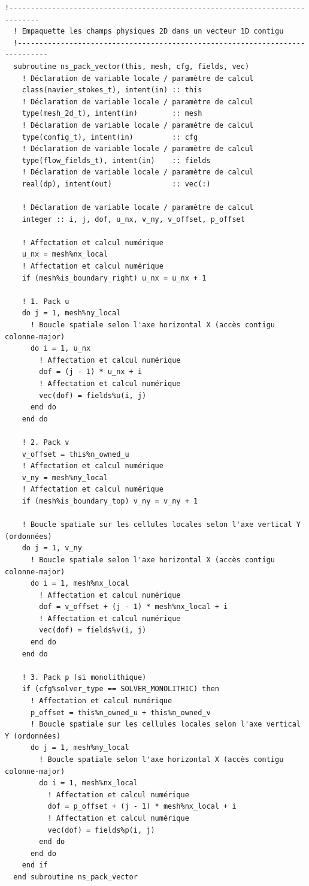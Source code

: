 \documentclass[10pt,a4paper,oneside]{book}
\begin{document}
\begin{lstlisting}[language={[95]Fortran}]
  !-----------------------------------------------------------------------------
  ! Empaquette les champs physiques 2D dans un vecteur 1D contigu
  !-----------------------------------------------------------------------------
  subroutine ns_pack_vector(this, mesh, cfg, fields, vec)
    ! Déclaration de variable locale / paramètre de calcul
    class(navier_stokes_t), intent(in) :: this
    ! Déclaration de variable locale / paramètre de calcul
    type(mesh_2d_t), intent(in)        :: mesh
    ! Déclaration de variable locale / paramètre de calcul
    type(config_t), intent(in)         :: cfg
    ! Déclaration de variable locale / paramètre de calcul
    type(flow_fields_t), intent(in)    :: fields
    ! Déclaration de variable locale / paramètre de calcul
    real(dp), intent(out)              :: vec(:)

    ! Déclaration de variable locale / paramètre de calcul
    integer :: i, j, dof, u_nx, v_ny, v_offset, p_offset

    ! Affectation et calcul numérique
    u_nx = mesh%nx_local
    ! Affectation et calcul numérique
    if (mesh%is_boundary_right) u_nx = u_nx + 1

    ! 1. Pack u
    do j = 1, mesh%ny_local
      ! Boucle spatiale selon l'axe horizontal X (accès contigu colonne-major)
      do i = 1, u_nx
        ! Affectation et calcul numérique
        dof = (j - 1) * u_nx + i
        ! Affectation et calcul numérique
        vec(dof) = fields%u(i, j)
      end do
    end do

    ! 2. Pack v
    v_offset = this%n_owned_u
    ! Affectation et calcul numérique
    v_ny = mesh%ny_local
    ! Affectation et calcul numérique
    if (mesh%is_boundary_top) v_ny = v_ny + 1

    ! Boucle spatiale sur les cellules locales selon l'axe vertical Y (ordonnées)
    do j = 1, v_ny
      ! Boucle spatiale selon l'axe horizontal X (accès contigu colonne-major)
      do i = 1, mesh%nx_local
        ! Affectation et calcul numérique
        dof = v_offset + (j - 1) * mesh%nx_local + i
        ! Affectation et calcul numérique
        vec(dof) = fields%v(i, j)
      end do
    end do

    ! 3. Pack p (si monolithique)
    if (cfg%solver_type == SOLVER_MONOLITHIC) then
      ! Affectation et calcul numérique
      p_offset = this%n_owned_u + this%n_owned_v
      ! Boucle spatiale sur les cellules locales selon l'axe vertical Y (ordonnées)
      do j = 1, mesh%ny_local
        ! Boucle spatiale selon l'axe horizontal X (accès contigu colonne-major)
        do i = 1, mesh%nx_local
          ! Affectation et calcul numérique
          dof = p_offset + (j - 1) * mesh%nx_local + i
          ! Affectation et calcul numérique
          vec(dof) = fields%p(i, j)
        end do
      end do
    end if
  end subroutine ns_pack_vector


\end{lstlisting}
\end{document}
